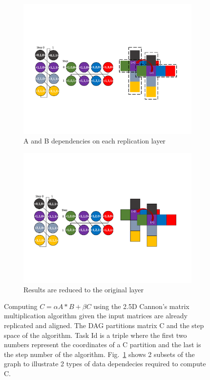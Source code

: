 \begin{figure}[htb]
\centering
\begin{subfigure}[b]{0.45\textwidth}
\includegraphics[width=\textwidth]{figures/cannon0.pdf}
\caption{A and B dependencies on each replication layer}
\label{deps}
\end{subfigure}
\begin{subfigure}[b]{0.37\textwidth}
\includegraphics[width=\textwidth]{figures/cannon1.pdf}
\caption{Results are reduced to the original layer}
\label{dataspace}
\end{subfigure}
\caption{Computing $C= \alpha A * B + \beta C$ using the 2.5D Cannon's matrix multiplication algorithm given the input matrices are already replicated and aligned. 
The DAG partitions matrix C and the step space of the algorithm.
Task Id is a triple where the first two numbers represent the coordinates of a C partition and the last is the step number of the algorithm. 
Fig.~\ref{deps} shows 2 subsets of the graph to illustrate 2 types of data dependecies required to compute C.}
\label{fig:25DCannon}
\end{figure}


